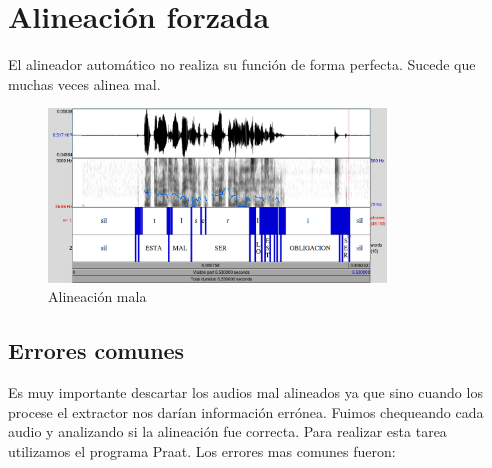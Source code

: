 \documentclass[11pt,a4paper,twoside]{tesis}
\begin{document}
\section{Alineación forzada}

El alineador automático no realiza su función de forma perfecta. Sucede que muchas veces alinea mal. 

\begin{figure}[h!]
    \centerline{\includegraphics[width=0.8\textwidth]{alineacion_mala_inf} }
    \caption{Alineación mala}
\end{figure}


\subsection{Errores comunes}

Es muy importante descartar los audios mal alineados ya que sino cuando los procese el extractor nos darían información errónea. Fuimos chequeando cada audio y analizando si la alineación fue correcta. Para realizar esta tarea utilizamos el programa Praat. Los errores mas comunes fueron:
\end{document}
